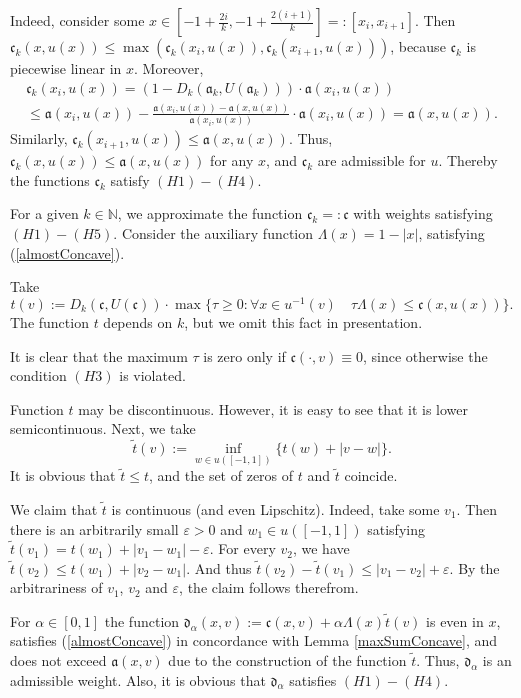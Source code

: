 \documentclass[12pt]{article}
\newcommand{\Nat}{\mathbb N}
\newcommand{\abs}[1]{\left\vert#1\right\vert}
\newcommand{\eps}{\varepsilon}
\renewcommand{\ge}{\geqslant}
\renewcommand{\le}{\leqslant}
\begin{document}
Indeed, consider some
$x \in [-1 + \frac{2i}{k}, -1 + \frac{2(i + 1)}{k}] =: [x_i, x_{i + 1}]$.
Then $\mathfrak c_k(x, u(x)) \le \max( \mathfrak c_k(x_i, u(x)), \mathfrak c_k(x_{i + 1}, u(x)) )$, because
$\mathfrak c_k$ is piecewise linear in $x$. Moreover,
\begin{multline*}
\mathfrak c_k(x_i, u(x)) = ( 1 - D_k(\mathfrak a_k, U(\mathfrak a_k))) \cdot \mathfrak a(x_i, u(x)) \\
\le \mathfrak a(x_i, u(x)) - \frac{\mathfrak a(x_i, u(x)) - \mathfrak a(x, u(x))}{\mathfrak a(x_i, u(x))} \cdot \mathfrak a(x_i, u(x)) = \mathfrak a(x, u(x)).
\end{multline*}
Similarly, $\mathfrak c_k(x_{i + 1}, u(x)) \le \mathfrak a(x, u(x))$.
Thus, $\mathfrak c_k(x, u(x)) \le \mathfrak a(x, u(x))$ for any $x$, and $\mathfrak c_k$ are admissible for $u$.
Thereby the functions $\mathfrak c_k$ satisfy $(H1)-(H4)$.

For a given $k \in \Nat$, we approximate the function $\mathfrak c_k =: \mathfrak c$ with weights satisfying $(H1)-(H5)$.
Consider the auxiliary function $\Lambda(x) = 1 - \abs{x}$, satisfying (\ref{almostConcave}).

Take
$$t(v):=D_k(\mathfrak c, U(\mathfrak c)) \cdot \max\{\tau \ge 0: \forall x \in u^{-1}(v) \quad \tau \Lambda(x) \le \mathfrak c(x, u(x))\}.$$
The function $t$ depends on $k$, but we omit this fact in presentation.

It is clear that the maximum $\tau$ is zero only if $\mathfrak c(\cdot, v) \equiv 0$,
since otherwise the condition $(H3)$ is violated.

Function $t$ may be discontinuous. However, it is easy to see that it is lower semicontinuous.
Next, we take
$$\tilde{t}(v) := \inf_{w \in u([-1, 1])} \{t(w) + |v - w|\}.$$
It is obvious that $\tilde{t} \le t$, and the set of zeros of $t$ and $\tilde{t}$ coincide.

We claim that $\tilde{t}$ is continuous (and even Lipschitz).
Indeed, take some $v_1$.
Then there is an arbitrarily small $\eps > 0$ and $w_1 \in u([-1, 1])$
satisfying $\tilde{t}(v_1) = t(w_1) + |v_1 - w_1| - \eps$.
For every $v_2$, we have $\tilde{t}(v_2) \le t(w_1) + |v_2 - w_1|$.
And thus $\tilde{t}(v_2) - \tilde{t}(v_1) \le |v_1 - v_2| + \eps$.
By the arbitrariness of $v_1$, $v_2$ and $\eps$, the claim follows therefrom.

For $\alpha \in [0, 1]$ the function $\mathfrak d_\alpha(x, v) := \mathfrak c(x, v) + \alpha \Lambda(x) \tilde{t}(v)$
is even in $x$, satisfies (\ref{almostConcave}) in concordance with Lemma \ref{maxSumConcave},
and does not exceed $\mathfrak a(x, v)$ due to the construction of the function $\tilde{t}$.
Thus, $\mathfrak d_\alpha$ is an admissible weight.
Also, it is obvious that $\mathfrak d_\alpha$ satisfies $(H1)-(H4)$.
\end{document}
